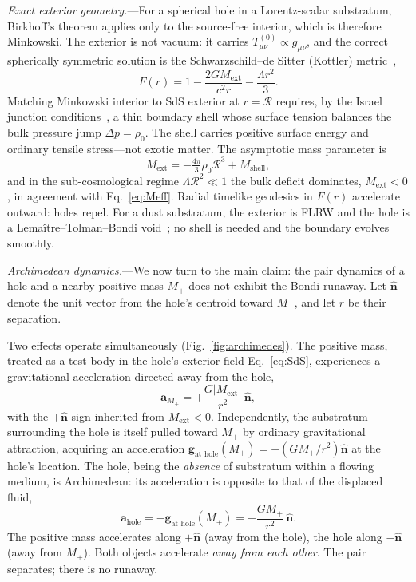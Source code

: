 \documentclass[%
  reprint,
  superscriptaddress,
  amsmath,amssymb,
  prl,
  floatfix,
  x11names
]{revtex4-2}
\begin{document}
\textit{Exact exterior geometry.}---For a spherical hole in a Lorentz-scalar substratum, Birkhoff's theorem applies only to the source-free interior, which is therefore Minkowski. The exterior is not vacuum: it carries $T^{(0)}_{\mu\nu}\propto g_{\mu\nu}$, and the correct spherically symmetric solution is the Schwarzschild--de Sitter (Kottler) metric~\cite{kottler-1918},
\begin{equation}
F(r)=1-\frac{2GM_{\text{ext}}}{c^2 r}-\frac{\Lambda r^2}{3}.
\label{eq:SdS}
\end{equation}
Matching Minkowski interior to SdS exterior at $r=\mathcal{R}$ requires, by the Israel junction conditions~\cite{israel-1966,poisson-2004}, a thin boundary shell whose surface tension balances the bulk pressure jump $\Delta p=\rho_0$. The shell carries positive surface energy and ordinary tensile stress---not exotic matter. The asymptotic mass parameter is
\begin{equation}
M_{\text{ext}}=-\tfrac{4\pi}{3}\rho_0\mathcal{R}^3+M_{\text{shell}},
\end{equation}
and in the sub-cosmological regime $\Lambda\mathcal{R}^2\ll 1$ the bulk deficit dominates, $M_{\text{ext}}<0$, in agreement with Eq.~\eqref{eq:Meff}. Radial timelike geodesics in $F(r)$ accelerate outward: holes repel. For a dust substratum, the exterior is FLRW and the hole is a Lema\^{i}tre--Tolman--Bondi void~\cite{tolman-1934,bondi-1947}; no shell is needed and the boundary evolves smoothly.

\textit{Archimedean dynamics.}---We now turn to the main claim: the pair dynamics of a hole and a nearby positive mass $M_+$ does not exhibit the Bondi runaway. Let $\hat{\mathbf{n}}$ denote the unit vector from the hole's centroid toward $M_+$, and let $r$ be their separation.

Two effects operate simultaneously (Fig.~\ref{fig:archimedes}). The positive mass, treated as a test body in the hole's exterior field Eq.~\eqref{eq:SdS}, experiences a gravitational acceleration directed away from the hole,
\begin{equation}
\mathbf{a}_{M_+}=+\frac{G|M_{\text{ext}}|}{r^2}\,\hat{\mathbf{n}},
\label{eq:aMplus}
\end{equation}
with the $+\hat{\mathbf{n}}$ sign inherited from $M_{\text{ext}}<0$. Independently, the substratum surrounding the hole is itself pulled toward $M_+$ by ordinary gravitational attraction, acquiring an acceleration $\mathbf{g}_{\text{at hole}}(M_+)=+(GM_+/r^2)\hat{\mathbf{n}}$ at the hole's location. The hole, being the \emph{absence} of substratum within a flowing medium, is Archimedean: its acceleration is opposite to that of the displaced fluid,
\begin{equation}
\mathbf{a}_{\text{hole}}=-\mathbf{g}_{\text{at hole}}(M_+)=-\frac{GM_+}{r^2}\,\hat{\mathbf{n}}.
\label{eq:ahole}
\end{equation}
The positive mass accelerates along $+\hat{\mathbf{n}}$ (away from the hole), the hole along $-\hat{\mathbf{n}}$ (away from $M_+$). Both objects accelerate \emph{away from each other}. The pair separates; there is no runaway.
\end{document}

